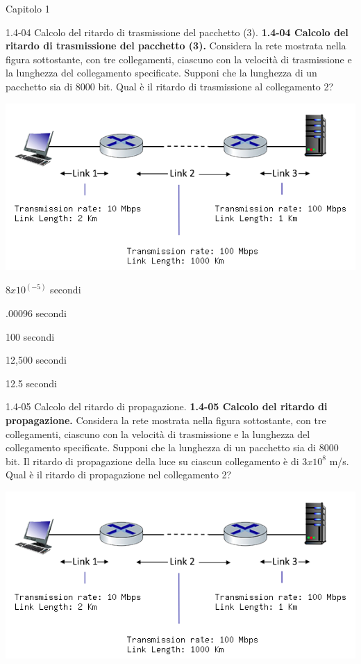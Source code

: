 \documentclass[a4paper]{article}
\begin{document}
\begin{quiz}{Capitolo 1}
\begin{multi}[points=1]{1.4-04 Calcolo del ritardo di trasmissione del pacchetto (3).}
\textbf{1.4-04 Calcolo del ritardo di trasmissione del pacchetto (3).} 
Considera la rete mostrata nella figura sottostante, con tre collegamenti, ciascuno con la velocità di trasmissione e la lunghezza del collegamento specificate. Supponi che la lunghezza di un pacchetto sia di 8000 bit. Qual è il ritardo di trasmissione al collegamento 2? 
\begin{center}
\includegraphics[width=\linewidth]{figs/1.4.4.png}
\end{center}
\item* $8 x 10^(-5)$ secondi
\item .00096 secondi
\item 100 secondi
\item 12,500 secondi
\item 12.5 secondi
\end{multi}

\begin{multi}[points=1]{1.4-05 Calcolo del ritardo di propagazione.}
\textbf{1.4-05 Calcolo del ritardo di propagazione.} 
Considera la rete mostrata nella figura sottostante, con tre collegamenti, ciascuno con la velocità di trasmissione e la lunghezza del collegamento specificate. Supponi che la lunghezza di un pacchetto sia di 8000 bit. Il ritardo di propagazione della luce su ciascun collegamento è di $3x10^8$ m/s.
Qual è il ritardo di propagazione nel collegamento 2? 
\begin{center}
\includegraphics[width=\linewidth]{figs/1.4.4.png}
\end{center}


\end{multi}
\end{quiz}
\end{document}
